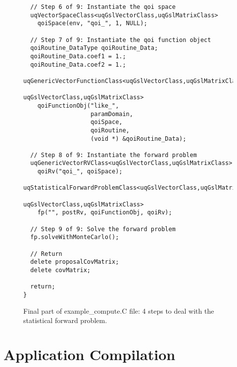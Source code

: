 \begin{figure}[h!]
\begin{center}
\begin{verbatim}
  // Step 6 of 9: Instantiate the qoi space
  uqVectorSpaceClass<uqGslVectorClass,uqGslMatrixClass>
    qoiSpace(env, "qoi_", 1, NULL);

  // Step 7 of 9: Instantiate the qoi function object
  qoiRoutine_DataType qoiRoutine_Data;
  qoiRoutine_Data.coef1 = 1.;
  qoiRoutine_Data.coef2 = 1.;
  uqGenericVectorFunctionClass<uqGslVectorClass,uqGslMatrixClass,
                               uqGslVectorClass,uqGslMatrixClass>
    qoiFunctionObj("like_",
                   paramDomain,
                   qoiSpace,
                   qoiRoutine,
                   (void *) &qoiRoutine_Data);

  // Step 8 of 9: Instantiate the forward problem
  uqGenericVectorRVClass<uqGslVectorClass,uqGslMatrixClass>
    qoiRv("qoi_", qoiSpace);
  uqStatisticalForwardProblemClass<uqGslVectorClass,uqGslMatrixClass,
                                   uqGslVectorClass,uqGslMatrixClass>
    fp("", postRv, qoiFunctionObj, qoiRv);

  // Step 9 of 9: Solve the forward problem
  fp.solveWithMonteCarlo();

  // Return
  delete proposalCovMatrix;
  delete covMatrix;

  return;
}
\end{verbatim}
\end{center}
\caption{
Final part of example\_compute.C file: 4 steps to deal with the statistical forward problem.
}
\label{fig-compute-c2}
\end{figure}

\clearpage
\section{Application Compilation}

